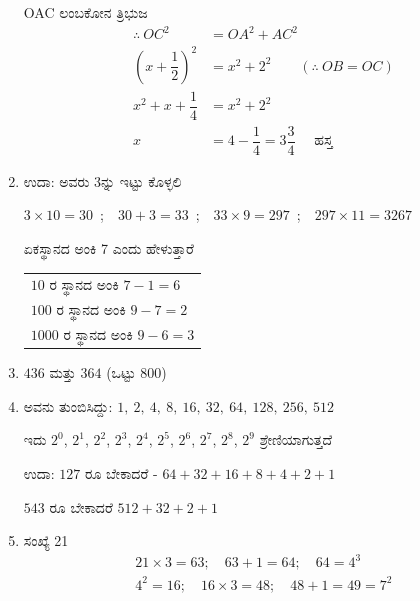 \begin{enumerate}
OAC ಲಂಬಕೋನ ತ್ರಿಭುಜ 
\begin{align*}
\therefore~ OC^{2} & = OA^{2} + AC^{2}\\
\left(x + \dfrac{1}{2}\right)^{2} & = x^{2} + 2^{2} \qquad(\therefore~ OB = OC)\\
x^{2} + x + \dfrac{1}{4} & = x^{2} + 2^{2}\\
x & = 4 - \dfrac{1}{4} = 3\dfrac{3}{4} \quad\text{ ಹಸ್ತ}
\end{align*}

\item  ಉದಾ: ಅವರು 3ನ್ನು ಇಟ್ಟು ಕೊಳ್ಳಲಿ 

$3 \times 10 = 30$~;~~$30 + 3 = 33$~;~~$33 \times 9 = 297$~;~~$297 \times 11 = 3267$ 

ಏಕಸ್ಥಾನದ ಅಂಕಿ 7 ಎಂದು ಹೇಳುತ್ತಾರೆ 

\begin{tabular}{l}
$10$ ರ ಸ್ಥಾನದ ಅಂಕಿ $7-1 = 6$\\
$100$ ರ ಸ್ಥಾನದ ಅಂಕಿ $9-7 = 2$\\
$1000$ ರ ಸ್ಥಾನದ ಅಂಕಿ $9-6 = 3$
\end{tabular}

\item $436$ ಮತ್ತು $364$ (ಒಟ್ಟು $800$)

\item ಅವನು ತುಂಬಿಸಿದ್ದು: $1, ~2, ~4, ~8, ~16, ~32, ~64, ~128, ~256, ~512$

ಇದು $2^{0}$,  $2^{1}$, $2^{2}$,  $2^{3}$,  $2^{4}$, $2^{5}$, $2^{6}$, $2^{7}$, $2^{8}$, $2^{9}$ ಶ್ರೇಣಿಯಾಗುತ್ತದೆ 

ಉದಾ: $127$ ರೂ ಬೇಕಾದರೆ - $64 + 32 + 16 + 8 + 4 + 2 + 1$

$543$ ರೂ ಬೇಕಾದರೆ $512 + 32 + 2 +1$

\item ಸಂಖ್ಯೆ 21
\begin{gather*}
21 \times 3=63;\quad 63+1=64;\quad 64=4^{3}\\
4^{2}=16;\quad 16\times 3=48;\quad 48+1=49=7^{2}
\end{gather*}
\end{enumerate}

